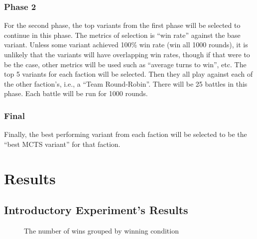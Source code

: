 \subsubsection{Phase 2}
For the second phase, the top variants from the first phase will be selected to continue in this phase. The metrics of selection is ``win rate'' against the base variant. Unless some variant achieved 100\% win rate (win all 1000 rounds), it is unlikely that the variants will have overlapping win rates, though if that were to be the case, other metrics will be used such as ``average turns to win'', etc. The top 5 variants for each faction will be selected. Then they all play against each of the other faction's, i.e., a ``Team Round-Robin''. There will be 25 battles in this phase. Each battle will be run for 1000 rounds.

\subsubsection{Final}
Finally, the best performing variant from each faction will be selected to be the ``best MCTS variant'' for that faction.



\section{Results}

\subsection{Introductory Experiment's Results}

\begin{figure}
    \centering
    \caption{The number of wins grouped by winning condition}
    \label{fig:wins-by-winner-condition}
\end{figure}

